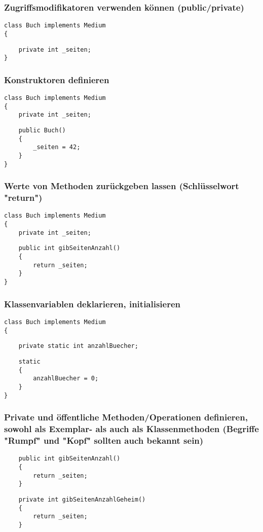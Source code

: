 \documentclass[mathserif]{beamer}
\begin{document}
\begin{frame}[fragile]
\frametitle{Zugriffsmodifikatoren verwenden k\"onnen (public/private)}
    \begin{lstlisting}
class Buch implements Medium 
{
    \end{lstlisting}
\pause
    \begin{lstlisting}
    private int _seiten;
}
    \end{lstlisting}
\end{frame}

\begin{frame}[fragile]
\frametitle{Konstruktoren definieren}
    \begin{lstlisting}
class Buch implements Medium 
{
    private int _seiten;
    \end{lstlisting}
\pause
    \begin{lstlisting}
    public Buch()
    {
        _seiten = 42;
    }
}
    \end{lstlisting}
\end{frame}

\begin{frame}[fragile]
\frametitle{Werte von Methoden zurückgeben lassen (Schlüsselwort "return")}
    \begin{lstlisting}
class Buch implements Medium 
{
    private int _seiten;
    \end{lstlisting}
\pause
    \begin{lstlisting}
    public int gibSeitenAnzahl()
    {
        return _seiten;
    }
}
    \end{lstlisting}
\end{frame}

\begin{frame}[fragile]
\frametitle{Klassenvariablen deklarieren, initialisieren}
    \begin{lstlisting}
class Buch implements Medium
{
    \end{lstlisting}
    \pause
    \begin{lstlisting}
    private static int anzahlBuecher;
    \end{lstlisting}
    \pause
    \begin{lstlisting}
    static
    {
        anzahlBuecher = 0;
    }
}
    \end{lstlisting}
\end{frame}

\begin{frame}[fragile]
\frametitle{Private und \"offentliche Methoden/Operationen definieren, sowohl als Exemplar- als auch als Klassenmethoden (Begriffe "Rumpf" und "Kopf" sollten auch bekannt sein)}
 \begin{lstlisting}
    public int gibSeitenAnzahl()
    {
        return _seiten;
    }
    \end{lstlisting}
    \pause
     \begin{lstlisting}
    private int gibSeitenAnzahlGeheim()
    {
        return _seiten;
    }
    \end{lstlisting}
\end{frame}
\end{document}
